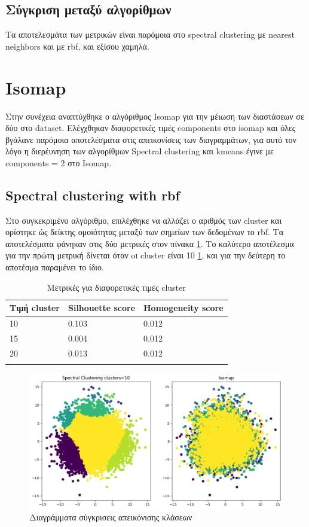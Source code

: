 	\subsection{Σύγκριση μεταξύ αλγορίθμων}
	Τα αποτελεσμάτα των μετρικών είναι παρόμοια στο spectral clustering με nearest neighbors και με rbf, και εξίσου χαμηλά.
	\clearpage
	
	\section{Isomap}
	Στην συνέχεια αναπτύχθηκε ο αλγόριθμος Isomap για την μέιωση των διαστάσεων σε δύο στο dataset. Ελέγχθηκαν διαφορετικές τιμές components στο isomap και όλες βγάλανε παρόμοια αποτελέσματα στις απεικονίσεις των διαγραμμάτων, για αυτό τον λόγο η διερέυνηση των αλγορίθμων Spectral clustering και kmeans έγινε με components = 2 στο Isomap.
	
	
	\subsection{Spectral clustering with rbf}
	
	Στο συγκεκριμένο αλγόριθμο, επιλέχθηκε να αλλάζει ο αριθμός των cluster και ορίστηκε ώς δείκτης ομοιότητας μεταξύ των σημείων των δεδομένων το rbf.
	Τα αποτελέσματα φάνηκαν στις δύο μετρικές στον πίνακα \ref{tab:abc8}. Το καλύτερο αποτέλεσμα για την πρώτη μετρική δίνεται όταν oι cluster είναι 10 \ref{f:g16}, και για την δεύτερη το αποτέσμα παραμένει το ίδιο.
	
	\begin{table}[ht]
		\centering
		\caption{Μετρικές για διαφορετικές τιμές cluster}
		\begin{tabular}{l | l | l}
			Τιμή cluster & Silhouette score &  Homogeneity score\\
			\hline
			10 & 0.103 & 0.012\\
			15 & 0.004&0.012\\
			20 & 0.013 & 0.012\\
			\label{tab:abc8}
		\end{tabular}
\end{table}		
		\begin{figure}[ht]
			\centering
			\includegraphics[width=1\linewidth]{Imagedata1/rbf_10isomap1.png}
			\caption{ Διαγράμματα σύγκρισεις απεικόνισης κλάσεων }
			\label{f:g16}	
		\end{figure}
		
